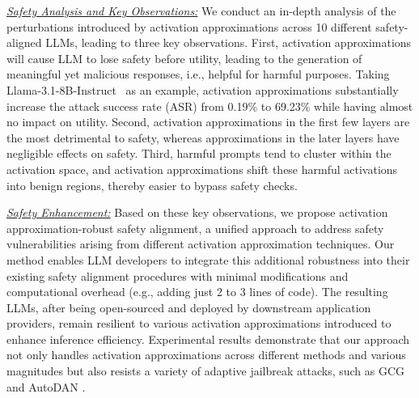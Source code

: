 \noindent\underline{\textit{Safety Analysis and Key Observations:}} We conduct an in-depth analysis of the perturbations introduced by activation approximations across 10 different safety-aligned LLMs, leading to three key observations. First, activation approximations will cause LLM to lose safety before utility, leading to the generation of meaningful yet malicious responses, i.e., helpful for harmful purposes. Taking Llama-3.1-8B-Instruct~\cite{meta2024introducing} as an example, activation approximations substantially increase the attack success rate (ASR) from 0.19\% to 69.23\% while having almost no impact on utility. Second, activation approximations in the first few layers are the most detrimental to safety, whereas approximations in the later layers have negligible effects on safety. Third, harmful prompts tend to cluster within the activation space, and activation approximations shift these harmful activations into benign regions, thereby easier to bypass safety checks.

\noindent\underline{\textit{Safety Enhancement:}} 
Based on these key observations, we propose activation approximation-robust safety alignment, a unified approach to address safety vulnerabilities arising from different activation approximation techniques. Our method enables LLM developers to integrate this additional robustness into their existing safety alignment procedures with minimal modifications and computational overhead (e.g., adding just 2 to 3 lines of code). The resulting LLMs, after being open-sourced and deployed by downstream application providers, remain resilient to various activation approximations introduced to enhance inference efficiency.
Experimental results demonstrate that our approach not only handles activation approximations across different methods and various magnitudes but also resists a variety of adaptive jailbreak attacks, such as GCG \cite{zou2023universal} and AutoDAN \cite{liu2024autodan}.


